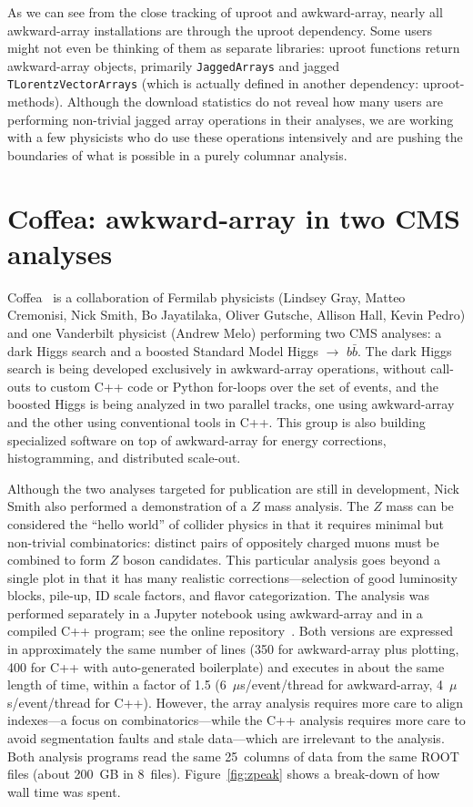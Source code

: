\documentclass[a4paper]{jpconf}
\begin{document}
As we can see from the close tracking of uproot and awkward-array, nearly all awkward-array installations are through the uproot dependency. Some users might not even be thinking of them as separate libraries: uproot functions return awkward-array objects, primarily {\tt JaggedArrays} and jagged {\tt TLorentzVectorArrays} (which is actually defined in another dependency: uproot-methods). Although the download statistics do not reveal how many users are performing non-trivial jagged array operations in their analyses, we are working with a few physicists who do use these operations intensively and are pushing the boundaries of what is possible in a purely columnar analysis.

\section{Coffea: awkward-array in two CMS analyses}

Coffea~\cite{coffea} is a collaboration of Fermilab physicists (Lindsey Gray, Matteo Cremonisi, Nick Smith, Bo Jayatilaka, Oliver Gutsche, Allison Hall, Kevin Pedro) and one Vanderbilt physicist (Andrew Melo) performing two CMS analyses: a dark Higgs search and a boosted Standard Model Higgs $\to$ $b\bar{b}$. The dark Higgs search is being developed exclusively in awkward-array operations, without call-outs to custom C++ code or Python for-loops over the set of events, and the boosted Higgs is being analyzed in two parallel tracks, one using awkward-array and the other using conventional tools in C++. This group is also building specialized software on top of awkward-array for energy corrections, histogramming, and distributed scale-out.

Although the two analyses targeted for publication are still in development, Nick Smith also performed a demonstration of a $Z$ mass analysis. The $Z$ mass can be considered the ``hello world'' of collider physics in that it requires minimal but non-trivial combinatorics: distinct pairs of oppositely charged muons must be combined to form $Z$ boson candidates. This particular analysis goes beyond a single plot in that it has many realistic corrections---selection of good luminosity blocks, pile-up, ID scale factors, and flavor categorization. The analysis was performed separately in a Jupyter notebook using awkward-array and in a compiled C++ program; see the online repository~\cite{zpeak}. Both versions are expressed in approximately the same number of lines (350 for awkward-array plus plotting, 400 for C++ with auto-generated boilerplate) and executes in about the same length of time, within a factor of 1.5 (6~$\mu$s/event/thread for awkward-array, 4~$\mu$s/event/thread for C++). However, the array analysis requires more care to align indexes---a focus on combinatorics---while the C++ analysis requires more care to avoid segmentation faults and stale data---which are irrelevant to the analysis. Both analysis programs read the same 25~columns of data from the same ROOT files (about 200~GB in 8~files). Figure~\ref{fig:zpeak} shows a break-down of how wall time was spent.
\end{document}
